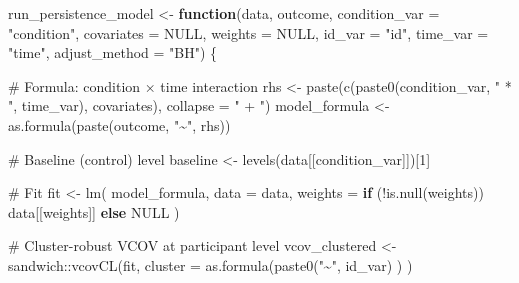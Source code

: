 \documentclass[
  letterpaper,
  DIV=11,
  numbers=noendperiod]{scrartcl}
\newenvironment{Shaded}{\begin{snugshade}}{\end{snugshade}}
\newcommand{\AttributeTok}[1]{\textcolor[rgb]{0.40,0.45,0.13}{#1}}
\newcommand{\CommentTok}[1]{\textcolor[rgb]{0.37,0.37,0.37}{#1}}
\newcommand{\ConstantTok}[1]{\textcolor[rgb]{0.56,0.35,0.01}{#1}}
\newcommand{\ControlFlowTok}[1]{\textcolor[rgb]{0.00,0.23,0.31}{\textbf{#1}}}
\newcommand{\DecValTok}[1]{\textcolor[rgb]{0.68,0.00,0.00}{#1}}
\newcommand{\FunctionTok}[1]{\textcolor[rgb]{0.28,0.35,0.67}{#1}}
\newcommand{\NormalTok}[1]{\textcolor[rgb]{0.00,0.23,0.31}{#1}}
\newcommand{\OtherTok}[1]{\textcolor[rgb]{0.00,0.23,0.31}{#1}}
\newcommand{\SpecialCharTok}[1]{\textcolor[rgb]{0.37,0.37,0.37}{#1}}
\newcommand{\StringTok}[1]{\textcolor[rgb]{0.13,0.47,0.30}{#1}}
\begin{document}
\begin{Shaded}
\begin{Highlighting}[]
\NormalTok{run\_persistence\_model }\OtherTok{\textless{}{-}} \ControlFlowTok{function}\NormalTok{(data,}
\NormalTok{                                  outcome,}
                                  \AttributeTok{condition\_var =} \StringTok{"condition"}\NormalTok{,}
                                  \AttributeTok{covariates    =} \ConstantTok{NULL}\NormalTok{,}
                                  \AttributeTok{weights       =} \ConstantTok{NULL}\NormalTok{,}
                                  \AttributeTok{id\_var        =} \StringTok{"id"}\NormalTok{,}
                                  \AttributeTok{time\_var      =} \StringTok{"time"}\NormalTok{,}
                                  \AttributeTok{adjust\_method =} \StringTok{"BH"}\NormalTok{) \{}
  
  \CommentTok{\# Formula: condition × time interaction}
\NormalTok{  rhs           }\OtherTok{\textless{}{-}} \FunctionTok{paste}\NormalTok{(}\FunctionTok{c}\NormalTok{(}\FunctionTok{paste0}\NormalTok{(condition\_var, }\StringTok{" * "}\NormalTok{, time\_var), }
\NormalTok{                           covariates),}
                         \AttributeTok{collapse =} \StringTok{" + "}\NormalTok{)}
\NormalTok{  model\_formula }\OtherTok{\textless{}{-}} \FunctionTok{as.formula}\NormalTok{(}\FunctionTok{paste}\NormalTok{(outcome, }\StringTok{"\textasciitilde{}"}\NormalTok{, rhs))}
  
  \CommentTok{\# Baseline (control) level}
\NormalTok{  baseline }\OtherTok{\textless{}{-}} \FunctionTok{levels}\NormalTok{(data[[condition\_var]])[}\DecValTok{1}\NormalTok{]}
  
  \CommentTok{\# Fit}
\NormalTok{  fit }\OtherTok{\textless{}{-}} \FunctionTok{lm}\NormalTok{(}
\NormalTok{    model\_formula,}
    \AttributeTok{data    =}\NormalTok{ data,}
    \AttributeTok{weights =} \ControlFlowTok{if}\NormalTok{ (}\SpecialCharTok{!}\FunctionTok{is.null}\NormalTok{(weights)) data[[weights]] }\ControlFlowTok{else} \ConstantTok{NULL}
\NormalTok{  )}
  
  \CommentTok{\# Cluster{-}robust VCOV at participant level}
\NormalTok{  vcov\_clustered }\OtherTok{\textless{}{-}}\NormalTok{ sandwich}\SpecialCharTok{::}\FunctionTok{vcovCL}\NormalTok{(fit, }
                                     \AttributeTok{cluster =} \FunctionTok{as.formula}\NormalTok{(}\FunctionTok{paste0}\NormalTok{(}\StringTok{"\textasciitilde{}"}\NormalTok{, id\_var)}
\NormalTok{                                     )}
\NormalTok{  )}
  

\end{Highlighting}
\end{Shaded}
\end{document}
